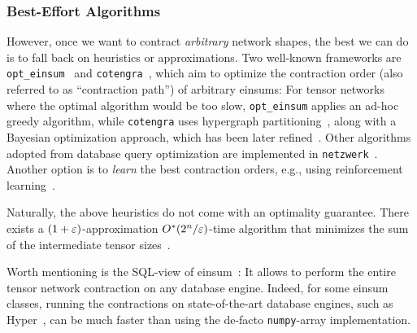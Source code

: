 \subsubsection{Best-Effort Algorithms}

However, once we want to contract \emph{arbitrary} network shapes, the best we can do is to fall back on heuristics or approximations. Two well-known frameworks are \texttt{opt\_einsum}~\cite{opt_einsum} and \texttt{cotengra}~\cite{cotengra}, which aim to optimize the contraction order (also referred to as ``contraction path'') of arbitrary einsums: For tensor networks where the optimal algorithm would be too slow, \texttt{opt\_einsum} applies an ad-hoc greedy algorithm, while \texttt{cotengra} uses hypergraph partitioning~\cite{kahypar}, along with a Bayesian optimization approach, which has been later refined~\cite{jena_tn_cut}. Other algorithms adopted from database query optimization are implemented in \texttt{netzwerk}~\cite{ttn_cost}. Another option is to \emph{learn} the best contraction orders, e.g., using reinforcement learning~\cite{meirom_tn_rl}.

Naturally, the above heuristics do not come with an optimality guarantee. There exists a $(1+\varepsilon)$-approximation $O^*(2^n / \varepsilon)$-time algorithm that minimizes the sum of the intermediate tensor sizes~\cite{dpconv}.

Worth mentioning is the SQL-view of einsum~\cite{einsum_as_sql}: It allows to perform the entire tensor network contraction on any database engine. Indeed, for some einsum classes, running the contractions on state-of-the-art database engines, such as Hyper~\cite{hyper}, can be much faster than using the de-facto \texttt{numpy}-array implementation.
